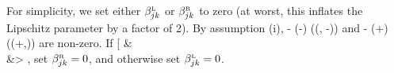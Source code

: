 For simplicity, we set either $\beta^{\text{\tiny L}}_{jk}$ or $\beta^{\text{\tiny R}}_{jk}$ to zero (at worst, this inflates the Lipschitz parameter by a factor of 2). 
By assumption (i),
\*[
    \max\Big\{\covdist\feat{j}\Big((\covleft\feat{j}, \covval\feat{j}-\inscale\feat{j})\Big), \covdist\feat{j}\Big((\covval\feat{j}+\inscale\feat{j},\covright\feat{j})\Big) \Big\} > 0,
\]
so one of 
\*[
    \EE_{\covobs\feat{j}\sim\covdist\feat{j}}\Big[\covobs\feat{j} \cdot\ind{\covobs\feat{j} \in (\covleft\feat{j}, \covval\feat{j}-\inscale\feat{j})}\Big] - (\covval{}-\inscale{}) \cdot \covdist{}\Big((\covleft{}, \covval{}-\inscale{})\Big)
\]
and
\*[
    \EE_{\covobs\feat{j}\sim\covdist\feat{j}}\Big[\covobs\feat{j} \cdot\ind{\covobs\feat{j} \in (\covval\feat{j}+\inscale\feat{j},\covright\feat{j})}\Big] - (\covval{}+\inscale{}) \cdot \covdist{}\Big((\covval{}+\inscale{},\covright{})\Big)
\]
are non-zero. 
If 
\*[
    &\hspace{-1em} \\
    &>
    ,
\]
set $\beta^{\text{\tiny R}}_{jk}=0$, and otherwise set $\beta^{\text{\tiny L}}_{jk}=0$.
\manualendproof



